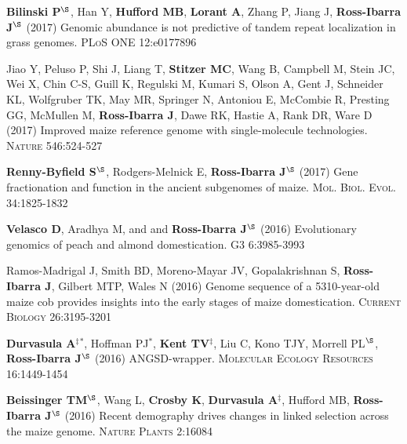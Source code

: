 \documentclass[letterpaper,10pt]{article}
\begin{document}
\begin{etaremune}
\item {\bf Bilinski P}$^\S$, Han Y, {\bf Hufford MB}, {\bf Lorant A}, Zhang P, Jiang J, {\bf Ross-Ibarra J}$^\S$ (2017) Genomic abundance is not predictive of tandem repeat localization in grass genomes. \textsc{PLoS ONE} 12:e0177896

\item  Jiao Y, Peluso P,  Shi J,  Liang T, {\bf Stitzer MC}, Wang B,  Campbell M, Stein JC,  Wei X,  Chin C-S,  Guill K,  Regulski M,  Kumari S,  Olson A,  Gent J, Schneider KL,  Wolfgruber TK, May MR, Springer N,  Antoniou E,  McCombie R, Presting GG,  McMullen M, {\bf Ross-Ibarra J}, Dawe RK,  Hastie A, Rank DR, Ware D (2017) Improved maize reference genome with single-molecule technologies. \textsc{Nature}  546:524-527

\item  {\bf Renny-Byfield S}$^\S$, Rodgers-Melnick E, {\bf Ross-Ibarra J}$^\S$ (2017) Gene fractionation and function in the ancient subgenomes of maize. \textsc{Mol. Biol. Evol.} 34:1825-1832

\item {\bf Velasco D}, Aradhya M, and  and {\bf Ross-Ibarra J}$^\S$ (2016) Evolutionary genomics of peach and almond domestication. \textsc{G3} 6:3985-3993

\item Ramos-Madrigal J, Smith BD, Moreno-Mayar JV, Gopalakrishnan S, {\bf Ross-Ibarra J}, Gilbert MTP, Wales N (2016) Genome sequence of a 5310-year-old maize cob provides insights into the early stages of maize domestication. \textsc{Current Biology} 26:3195-3201

\item {\bf Durvasula A}$^\ddagger$$^*$,  Hoffman PJ$^*$, {\bf Kent TV}$^\ddagger$, Liu C, Kono TJY, Morrell PL$^\S$, {\bf Ross-Ibarra J}$^\S$ (2016) ANGSD-wrapper. \textsc{Molecular Ecology Resources} 16:1449-1454

\item {\bf Beissinger TM}$^\S$, Wang L, {\bf Crosby K}, {\bf Durvasula A}$^\ddagger$, Hufford MB, {\bf Ross-Ibarra J}$^\S$ (2016)  Recent demography drives changes in linked selection across the maize genome. \textsc{Nature Plants} 2:16084


\end{etaremune}
\end{document}
